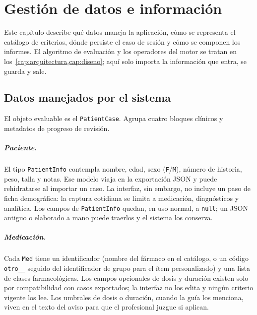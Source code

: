 
\chapter{Gestión de datos e información}
\label{cap:datos}

Este capítulo describe qué datos maneja la aplicación, cómo se representa el
catálogo de criterios, dónde persiste el caso de sesión y cómo se componen
los informes. El algoritmo de evaluación y los operadores del motor se
tratan en los~\cref{cap:arquitectura,cap:diseno}; aquí solo importa la
información que entra, se guarda y sale.

\section{Datos manejados por el sistema}
\label{sec:datos-manejados}

El objeto evaluable es el \texttt{PatientCase}. Agrupa cuatro bloques
clínicos y metadatos de progreso de revisión.

\paragraph{Paciente.}
El tipo \texttt{PatientInfo} contempla nombre, edad, sexo (\texttt{F}/\texttt{M}),
número de historia, peso, talla y notas. Ese modelo viaja en la exportación
JSON y puede rehidratarse al importar un caso. La interfaz, sin embargo, no
incluye un paso de ficha demográfica: la captura cotidiana se limita a
medicación, diagnósticos y analítica. Los campos de \texttt{PatientInfo}
quedan, en uso normal, a \texttt{null}; un JSON antiguo o elaborado a mano
puede traerlos y el sistema los conserva.

\paragraph{Medicación.}
Cada \texttt{Med} tiene un identificador (nombre del fármaco en el catálogo,
o un código \texttt{otro\_\_} seguido del identificador de grupo para el ítem
personalizado) y una lista
de clases farmacológicas. Los campos opcionales de dosis y duración existen
solo por compatibilidad con casos exportados; la interfaz no los edita y
ningún criterio vigente los lee. Los umbrales de dosis o duración, cuando
la guía los menciona, viven en el texto del aviso para que el profesional
juzgue si aplican.

